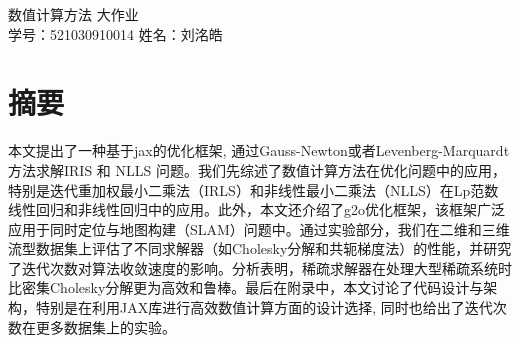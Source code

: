 \documentclass{ctexart}
\begin{document}








\begin{center}
	\Large{数值计算方法 大作业} \\
	\normalsize{学号：521030910014}
	\normalsize{姓名：刘洺皓}
	\vspace{0.4cm}
\end{center}

\section{摘要}
本文提出了一种基于jax的优化框架, 通过Gauss-Newton或者Levenberg-Marquardt方法求解IRIS 和 NLLS 问题。我们先综述了数值计算方法在优化问题中的应用，特别是迭代重加权最小二乘法（IRLS）和非线性最小二乘法（NLLS）在Lp范数线性回归和非线性回归中的应用。此外，本文还介绍了g2o优化框架，该框架广泛应用于同时定位与地图构建（SLAM）问题中。通过实验部分，我们在二维和三维流型数据集上评估了不同求解器（如Cholesky分解和共轭梯度法）的性能，并研究了迭代次数对算法收敛速度的影响。分析表明，稀疏求解器在处理大型稀疏系统时比密集Cholesky分解更为高效和鲁棒。最后在附录中，本文讨论了代码设计与架构，特别是在利用JAX库进行高效数值计算方面的设计选择, 同时也给出了迭代次数在更多数据集上的实验。
\end{document}
